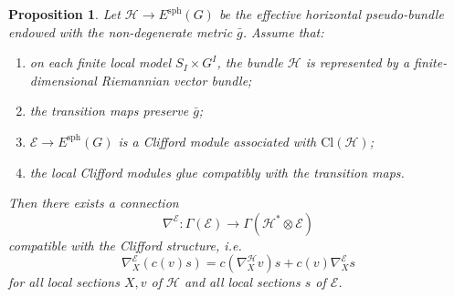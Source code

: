 \documentclass[10pt,a4paper]{amsart}
\newtheorem{proposition}{Proposition}
\begin{document}
\begin{proposition}
Let \(\mathcal H\to E^{\mathrm{sph}}(G)\) be the effective horizontal
pseudo-bundle endowed with the non-degenerate metric \(\bar g\). Assume that:
\begin{enumerate}
\item on each finite local model \(S_I\times G^I\), the bundle
\(\mathcal H\) is represented by a finite-dimensional Riemannian vector bundle;
\item the transition maps preserve \(\bar g\);
\item \(\mathcal E\to E^{\mathrm{sph}}(G)\) is a Clifford module associated
with \(\mathrm{Cl}(\mathcal H)\);
\item the local Clifford modules glue compatibly with the transition maps.
\end{enumerate}
Then there exists a connection
\[
\nabla^{\mathcal E}:\Gamma(\mathcal E)
\longrightarrow
\Gamma(\mathcal H^*\otimes \mathcal E)
\]
compatible with the Clifford structure, i.e.
\[
\nabla^{\mathcal E}_X(c(v)s)
=
c(\nabla^{\mathcal H}_X v)s
+
c(v)\nabla^{\mathcal E}_X s
\]
for all local sections \(X,v\) of \(\mathcal H\) and all local sections
\(s\) of \(\mathcal E\).
\end{proposition}
\end{document}
